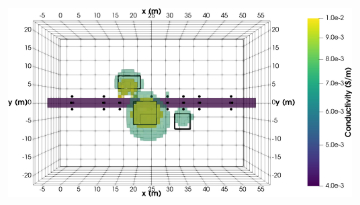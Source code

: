 \documentclass[preprint,authoryear,12pt]{elsarticle}
\begin{document}
\begin{figure}[htp]{}
\begin{center}
\begin{subfigure}{0.55\linewidth}
      \end{subfigure}
      \hspace{-4.0cm}
      \qquad
      \begin{subfigure}{0.55\linewidth}
         \label{fig:InvMod_MultiBlk_StraightTunnel_Charge1_Top_ISO}
         \includegraphics[trim=0cm 0cm 0cm 0cm, clip=true,width=\linewidth]{./figures/Fig22d.png}
      \end{subfigure}
      \vspace{0.2cm}


\end{center}
\end{figure}
\end{document}
